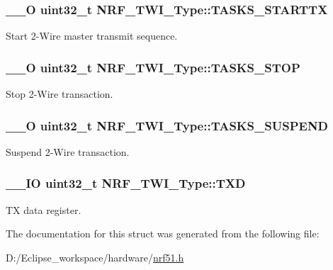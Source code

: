 \subsubsection[{T\+A\+S\+K\+S\+\_\+\+S\+T\+A\+R\+T\+T\+X}]{\setlength{\rightskip}{0pt plus 5cm}\+\_\+\+\_\+\+O uint32\+\_\+t N\+R\+F\+\_\+\+T\+W\+I\+\_\+\+Type\+::\+T\+A\+S\+K\+S\+\_\+\+S\+T\+A\+R\+T\+T\+X}\label{struct_n_r_f___t_w_i___type_a3f940c03e49fd48e1a6512cd6bd5ffb6}
Start 2-\/\+Wire master transmit sequence. \hypertarget{struct_n_r_f___t_w_i___type_a47256e642269079da3e8f12d5605f7f8}{}
\subsubsection[{T\+A\+S\+K\+S\+\_\+\+S\+T\+O\+P}]{\setlength{\rightskip}{0pt plus 5cm}\+\_\+\+\_\+\+O uint32\+\_\+t N\+R\+F\+\_\+\+T\+W\+I\+\_\+\+Type\+::\+T\+A\+S\+K\+S\+\_\+\+S\+T\+O\+P}\label{struct_n_r_f___t_w_i___type_a47256e642269079da3e8f12d5605f7f8}
Stop 2-\/\+Wire transaction. \hypertarget{struct_n_r_f___t_w_i___type_aad60c79e5c883b3f61ec362e88cf6832}{}
\subsubsection[{T\+A\+S\+K\+S\+\_\+\+S\+U\+S\+P\+E\+N\+D}]{\setlength{\rightskip}{0pt plus 5cm}\+\_\+\+\_\+\+O uint32\+\_\+t N\+R\+F\+\_\+\+T\+W\+I\+\_\+\+Type\+::\+T\+A\+S\+K\+S\+\_\+\+S\+U\+S\+P\+E\+N\+D}\label{struct_n_r_f___t_w_i___type_aad60c79e5c883b3f61ec362e88cf6832}
Suspend 2-\/\+Wire transaction. \hypertarget{struct_n_r_f___t_w_i___type_a7e2441eaf8a7c556478f105357096454}{}
\subsubsection[{T\+X\+D}]{\setlength{\rightskip}{0pt plus 5cm}\+\_\+\+\_\+\+I\+O uint32\+\_\+t N\+R\+F\+\_\+\+T\+W\+I\+\_\+\+Type\+::\+T\+X\+D}\label{struct_n_r_f___t_w_i___type_a7e2441eaf8a7c556478f105357096454}
T\+X data register. 

The documentation for this struct was generated from the following file\+:\begin{DoxyCompactItemize}
\item 
D\+:/\+Eclipse\+\_\+workspace/hardware/\hyperlink{nrf51_8h}{nrf51.\+h}\end{DoxyCompactItemize}
